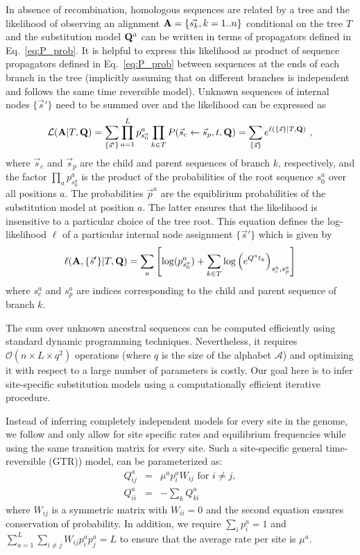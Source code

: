 \documentclass[aps,rmp,twocolumn]{revtex4}
\newcommand{\mat}[1]{{\bf #1}}
\newcommand{\abet}{\mathcal{A}}
\newcommand{\eqp}{p}
\newcommand{\LH}{\mathcal{L}}
\newcommand{\lh}{\ell}
\begin{document}
In absence of recombination, homologous sequences are related by a tree and the likelihood of observing an alignment $\mat{A}=\{\vec{s_k}, k=1..n\}$ conditional on the tree $T$ and the substitution model $\mat{Q}^{a}$ can be written in terms of propagators defined in Eq.~\ref{eq:P_prob}.
It is helpful to express this likelihood as product of sequence propagators defined in Eq.~\ref{eq:P_prob} between sequences at the ends of each branch in the tree (implicitly assuming that on different branches is independent and follows the same time reversible model).
Unknown sequences of internal nodes $\{\vec{s}'\}$ need to be summed over and the likelihood can be expressed as
\begin{equation}
	\LH(\mat{A}|T,\mat{Q}) = \sum_{\{\vec{s}'\}}\prod_{a=1}^L \eqp^{a}_{s^{a}_0} \prod_{k\in T}P(\vec{s}_c\leftarrow \vec{s}_p,t,\mat{Q}) = \sum_{\{\vec{s}\}} e^{\lh(\{\vec{s}\} |T, \mat{Q})}  \ ,
	\label{eq:LH}
\end{equation}
where $\vec{s}_c$ and $\vec{s}_p$ are the child and parent sequences of branch $k$, respectively, and the factor $\prod_a \eqp^{a}_{s^{a}_0}$ is the product of the probabilities of the root sequence $s^{a}_0$ over all positions $a$.
The probabilities $\vec{\eqp}^{a}$ are the equiblirium probabilities of the substitution model at position $a$.
The latter ensures that the likelihood is insensitive to a particular choice of the tree root.
This equation defines the log-likelihood $\lh$ of a particular internal node assignment $\{\vec{s}'\}$ which is given by
\begin{equation}
	\label{eq:logLH}
	\lh(\mat{A}, \{\vec{s}'\} |T, \mat{Q}) = \sum_a \left[\log(\eqp^a_{s^{a}_0}) + \sum_{k\in T} \log\left( e^{Q^at_k} \right)_{s^a_c, s^a_p}\right]
\end{equation}
where $s^a_c$ and $s^a_p$ are indices corresponding to the child and parent sequence of branch $k$.

The sum over unknown ancestral sequences can be computed efficiently using standard dynamic programming techniques.
Nevertheless, it requires $\mathcal{O}(n\times L \times q^2)$ operations (where $q$ is the size of the alphabet $\abet$) and optimizing it with respect to a large number of parameters is costly.
Our goal here is to infer site-specific substitution models using a computationally efficient iterative procedure.

Instead of inferring completely independent models for every site in the genome, we follow \citet{halpern_evolutionary_1998} and only allow for site specific rates and equilibrium frequencies while using the same transition matrix for every site.
Such a site-specific general time-reversible (GTR)) model, can be parameterized as:
\begin{eqnarray}
Q^{a}_{ij} &=& \mu^{a}\eqp^{a}_{i} W_{ij} \textrm{ for } i\neq j,\nonumber \\
Q^{a}_{ii} &=& -\sum_k Q^{a}_{ki}
\label{eq:Qij_app}
\end{eqnarray}
where $W_{ij}$ is a symmetric matrix with $W_{ii}=0$ and the second equation ensures conservation of probability.
In addition, we require $\sum_i \eqp^{a}_i = 1$ and $\sum_{a=1}^L\sum_{i\neq j}W_{ij}p^{a}_ip^{a}_j=L$ to ensure that the average rate per site is $\mu^{a}$.
\end{document}
